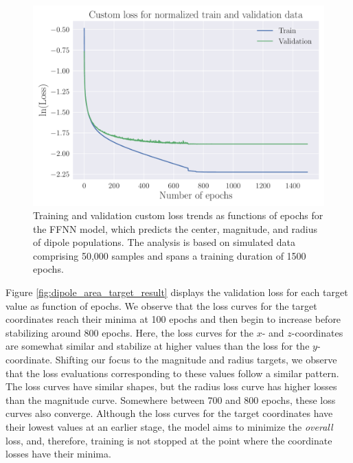 \documentclass[a4paper, UKenglish, 11pt]{uiomaster}
\begin{document}
\begin{figure}[!htb]
    \centering
    \includegraphics[width=\linewidth]{figures/NN_area/Custom_Loss_area_seed_42_cnn_32_0.001_0.35_0.1_0_1500_(0).pdf}
    \caption{Training and validation custom loss trends as functions of epochs for the FFNN model, which predicts the center, magnitude, and radius of dipole populations. The analysis is based on simulated data comprising 50,000 samples and spans a training duration of 1500 epochs.}
    \label{fig:dipole_area_result}
\end{figure}

Figure \ref{fig:dipole_area_target_result} displays the validation loss for each target value as function of epochs. We observe that the loss curves for the target coordinates reach their minima at 100 epochs and then begin to increase before stabilizing around 800 epochs. Here, the loss curves for the $x$- and $z$-coordinates are somewhat similar and stabilize at higher values than the loss for the $y$-coordinate. Shifting our focus to the magnitude and radius targets, we observe that the loss evaluations corresponding to these values follow a similar pattern. The loss curves have similar shapes, but the radius loss curve has higher losses than the magnitude curve. Somewhere between 700 and 800 epochs, these loss curves also converge. Although the loss curves for the target coordinates have their lowest values at an earlier stage, the model aims to minimize the \emph{overall} loss, and, therefore, training is not stopped at the point where the coordinate losses have their minima.
\end{document}
